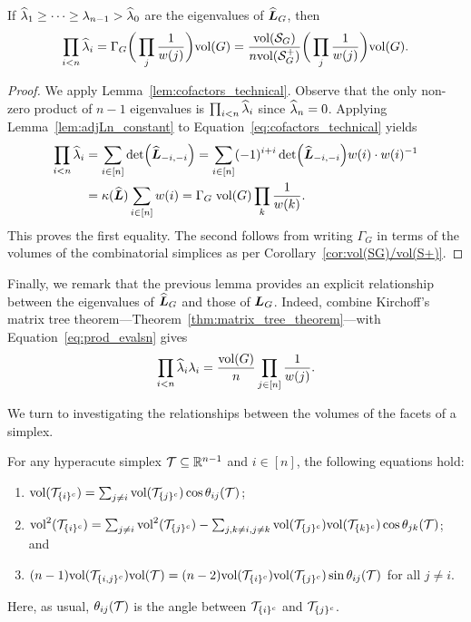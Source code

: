 \begin{lemma}
	\label{lem:prod_evalsn}
	If $\widehat{\lambda}_1\geq \dots \geq  \lambda_{n-1}>\widehat{\lambda}_0$ are the eigenvalues of $\widehat{\vb*{L}}_G$, then 
	\begin{equation}
	\label{eq:prod_evalsn}
	\prod_{i<n} \widehat{\lambda}_i =\Gamma_G\bigg(\prod_j \frac{1}{w(j)}\bigg) \textnormal{vol}(G) = \frac{\textnormal{vol}(\mathcal{S}_G)}{n\textnormal{vol}(\mathcal{S}^+_G)}\bigg(\prod_j \frac{1}{w(j)}\bigg) \textnormal{vol}(G). 
	\end{equation}
\end{lemma}
\begin{proof}
	We apply Lemma~\ref{lem:cofactors_technical}. 
	Observe that the only non-zero product of  $n-1$ eigenvalues is $\prod_{i<n} \widehat{\lambda}_i$ since $\widehat{\lambda}_n=0$.  Applying  Lemma~\ref{lem:adjLn_constant} to Equation~\eqref{eq:cofactors_technical} yields 
	\begin{align*}
	\prod_{i<n}\widehat{\lambda}_i &=  \sum_{i\in[n]} \det(\widehat{\vb*{L}}_{-i,-i}) =  \sum_{i\in[n]} (-1)^{i+i}\det(\widehat{\vb*{L}}_{-i,-i}) w(i) \cdot w(i)^{-1}\\
	&= \kappa(\widehat{\vb*{L}}) \sum_{i\in[n]} w(i) = \Gamma_G\; \textnormal{vol}(G) \prod_k\frac{1}{w(k)}.  
	\end{align*}
	This proves the first  equality. The second follows from writing $\Gamma_G$ in terms of the volumes of the combinatorial simplices as per Corollary~\ref{cor:vol(SG)/vol(S+)}. 
\end{proof}

Finally,  we remark that the previous lemma provides an explicit relationship  between the  eigenvalues of  $\widehat{\vb*{L}}_G$ and those of $\vb*{L}_G$. Indeed, combine Kirchoff's matrix tree theorem---Theorem~\ref{thm:matrix_tree_theorem}---with  Equation~\eqref{eq:prod_evalsn} gives 
\begin{equation*}
	\prod_{i<n}\widehat{\lambda}_i \lambda_i = \frac{\textnormal{vol}(G)}{n}\prod_{j\in[n]}\frac{1}{w(j)}.
\end{equation*}



We turn  to  investigating the   relationships between the volumes  of the facets  of a  simplex. 

\begin{lemma}
	\label{lem:volT_multi}
	For any hyperacute simplex $\mathcal{T}\subseteq\mathbb{R}^{n-1}$ and  $i\in[n]$, the following equations hold:
	\begin{enumerate}
		\item $\textnormal{vol}(\mathcal{T}_{\{i\}^c}) = \sum_{j\neq i}\textnormal{vol}(\mathcal{T}_{\{j\}^c})\cos\theta_{ij}(\mathcal{T})$;
		\item $\textnormal{vol}^2(\mathcal{T}_{\{i\}^c}) =  \sum_{j\neq i}\textnormal{vol}^2(\mathcal{T}_{\{j\}^c}) - \sum_{j,k\neq i,j\neq k} \textnormal{vol}(\mathcal{T}_{\{j\}^c})\textnormal{vol}(\mathcal{T}_{\{k\}^c})\cos\theta_{jk}(\mathcal{T})$; and
		\item $(n-1)\textnormal{vol}(\mathcal{T}_{\{i,j\}^c})\textnormal{vol}(\mathcal{T}) = (n-2)\textnormal{vol}(\mathcal{T}_{\{i\}^c})\textnormal{vol}(\mathcal{T}_{\{j\}^c})\sin\theta_{ij}(\mathcal{T})$ for  all $j\neq i$. 
	\end{enumerate}
	Here, as usual, $\theta_{ij}(\mathcal{T})$ is the angle between $\mathcal{T}_{\{i\}^c}$ and $\mathcal{T}_{\{j\}^c}$. 
\end{lemma}


